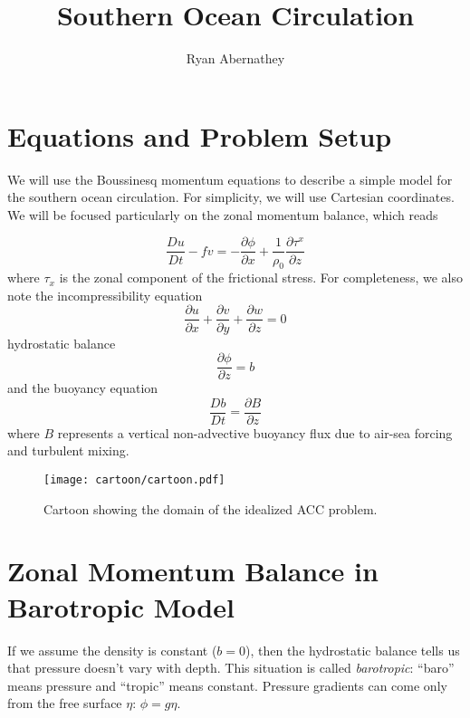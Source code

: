 \documentclass[12pt]{article}
\title{ Southern Ocean Circulation }
\author{Ryan Abernathey}
\date{} %
\newcommand{\pd}[2]{ \frac{\partial #1}{\partial #2} }
\newcommand{\td}[2]{\ensuremath{\frac{D #1}{D #2}}}
\begin{document}
 \maketitle \tableofcontents

\section{Equations and Problem Setup}

We will use the Boussinesq momentum equations to describe a simple model for the southern ocean circulation. For simplicity, we will use Cartesian coordinates. We will be focused particularly on the zonal momentum balance, which reads

\begin{equation}
\td{u}{t}  - f v = - \pd{\phi}{x} + \frac{1}{\rho_0}\pd{\tau^x}{z} 
\end{equation}
where $\tau_x$ is the zonal component of the frictional stress. For completeness, we also note the incompressibility equation
\begin{equation}
\pd{u}{x} + \pd{v}{y} + \pd{w}{z} = 0 
\end{equation}
hydrostatic balance
\begin{equation}
\pd{\phi}{z} = b
\end{equation}
and the buoyancy equation
\begin{equation}
\td{b}{t} = \pd{B}{z}
\label{eq:b}
\end{equation}
where $B$ represents a vertical non-advective buoyancy flux due to air-sea forcing and turbulent mixing.

\begin{figure}[htbp]
\begin{center}
\texttt{[image: cartoon/cartoon.pdf]}
\caption{Cartoon showing the domain of the idealized ACC problem.}
\label{fig:cartoon}
\end{center}
\end{figure}

\section{Zonal Momentum Balance in Barotropic Model}
If we assume the density is constant ($b=0$), then the hydrostatic balance tells us that pressure doesn't vary with depth. This situation is called {\em barotropic}: ``baro'' means pressure and ``tropic'' means constant. Pressure gradients can come only from the free surface $\eta$: $\phi = g \eta$.
\end{document}
